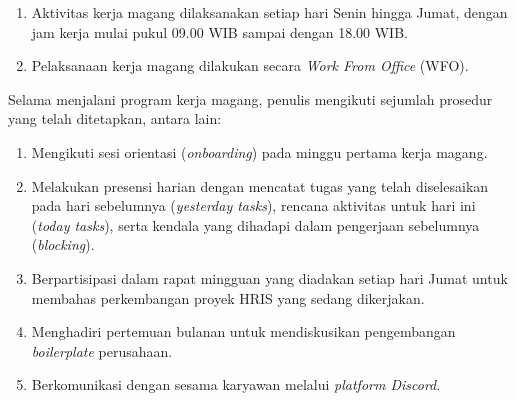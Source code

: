 \begin{enumerate}
    \item Aktivitas kerja magang dilaksanakan setiap hari Senin hingga Jumat, 
    dengan jam kerja mulai pukul 09.00 WIB sampai dengan 18.00 WIB.
    \item Pelaksanaan kerja magang dilakukan secara \textit{Work From Office} (WFO).
\end{enumerate}

Selama menjalani program kerja magang, penulis mengikuti sejumlah prosedur yang telah ditetapkan, antara lain:

\begin{enumerate}
    \item Mengikuti sesi orientasi (\textit{onboarding}) pada minggu pertama kerja magang.
    \item Melakukan presensi harian dengan mencatat tugas yang telah diselesaikan 
    pada hari sebelumnya (\textit{yesterday tasks}), rencana aktivitas untuk hari ini 
    (\textit{today tasks}), serta kendala yang dihadapi dalam pengerjaan sebelumnya (\textit{blocking}).
    \item Berpartisipasi dalam rapat mingguan yang diadakan setiap hari Jumat 
    untuk membahas perkembangan proyek HRIS yang sedang dikerjakan.
    \item Menghadiri pertemuan bulanan untuk mendiskusikan pengembangan 
    \textit{boilerplate} perusahaan.
    \item Berkomunikasi dengan sesama karyawan melalui \textit{platform Discord}.
\end{enumerate}
